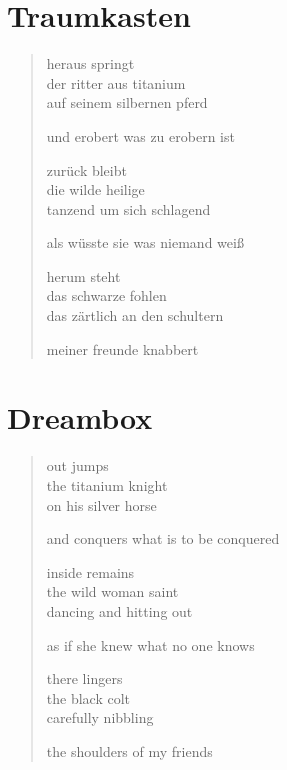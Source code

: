
\cleartoverso

\section{Traumkasten}

\begin{verse}

heraus springt\\
der ritter aus titanium\\
auf seinem silbernen pferd

und erobert was zu erobern ist

zurück bleibt\\
die wilde heilige\\
tanzend um sich schlagend

als wüsste sie was niemand weiß

herum steht\\
das schwarze fohlen\\
das zärtlich an den schultern

meiner freunde knabbert

\end{verse}

\clearpage

\section{Dreambox}

\begin{verse}

out jumps\\
the titanium knight\\
on his silver horse

and conquers what is to be conquered

inside remains\\
the wild woman saint\\
dancing and hitting out

as if she knew what no one knows

there lingers\\
the black colt\\
carefully nibbling

the shoulders of my friends

\end{verse}
